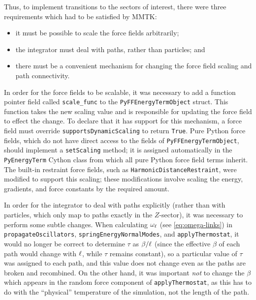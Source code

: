 Thus, to implement transitions to the sectors of interest, there were three requirements which had to be satisfied by MMTK:
\begin{itemize}
	\item it must be possible to scale the force fields arbitrarily;
	\item the integrator must deal with paths, rather than particles; and
	\item there must be a convenient mechanism for changing the force field scaling and path connectivity.
\end{itemize}

In order for the force fields to be scalable, it was necessary to add a function pointer field called \texttt{scale\_func} to the \texttt{PyFFEnergyTermObject} struct.
This function takes the new scaling value and is responsible for updating the force field to effect the change.
To declare that it has support for this mechanism, a force field must override \texttt{supportsDynamicScaling} to return \texttt{True}.
Pure Python force fields, which do not have direct access to the fields of \texttt{PyFFEnergyTermObject}, should implement a \texttt{setScaling} method; it is assigned automatically in the \texttt{PyEnergyTerm} Cython class from which all pure Python force field terms inherit.
The built-in restraint force fields, such as \texttt{HarmonicDistanceRestraint}, were modified to support this scaling; these modifications involve scaling the energy, gradients, and force constants by the required amount.

In order for the integrator to deal with paths explicitly (rather than with particles, which only map to paths exactly in the $Z$-sector), it was necessary to perform some subtle changes.
When calculating $\omega_\ell$ (see \vref{eq:omega-links}) in \texttt{propagateOscillators}, \texttt{springEnergyNormalModes}, and \texttt{applyThermostat}, it would no longer be correct to determine $\tau$ as $\beta / \ell$ (since the effective $\beta$ of each path would change with $\ell$, while $\tau$ remains constant), so a particular value of $\tau$ was assigned to each path, and this value does not change even as the paths are broken and recombined.
On the other hand, it was important \emph{not} to change the $\beta$ which appears in the random force component of \texttt{applyThermostat}, as this has to do with the ``physical'' temperature of the simulation, not the length of the path.

